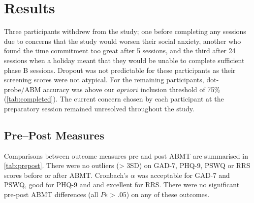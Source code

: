 \documentclass[man,floatsintext,a4paper,biblatex]{apa6}\usepackage[]{graphicx}\usepackage[]{color}
\begin{document}
\section{Results}

Three participants withdrew from the study; one before completing any
sessions due to concerns that the study would worsen their social anxiety,
another who found the time commitment too great after 5 sessions, and the
third after 24 sessions when a holiday meant that they would be unable
to complete sufficient phase B sessions. Dropout was not predictable for
these participants as their screening scores were not atypical. For the
remaining participants, dot-probe/ABM accuracy was above our ${a priori}$
inclusion threshold of 75\% (\cref{tab:completed}). The current concern
chosen by each participant at the preparatory session remained unresolved
throughout the study.

\belowrulesep=1pt


\subsection{Pre--Post Measures}

Comparisons between outcome measures pre and post ABMT are summarised in
\cref{tab:prepost}. There were no outliers (> 3SD) on GAD-7, PHQ-9, PSWQ
or RRS scores before or after ABMT. Cronbach's $\alpha$ was acceptable
for GAD-7 and PSWQ, good for PHQ-9 and and excellent for RRS. There were
no significant pre-post ABMT differences (all ${P}$s {\textgreater} .05)
on any of these outcomes.
\end{document}
